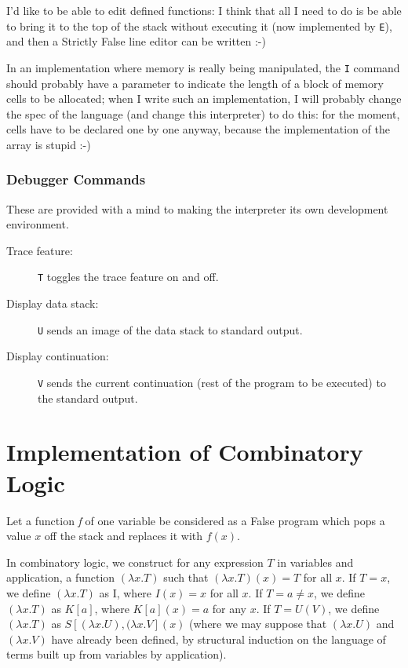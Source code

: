 \documentclass[12pt]{article}
\begin{document}
I'd like to be able to edit defined functions: I think that all I need
to do is be able to bring it to the top of the stack without executing
it (now implemented by {\tt E}), and then a Strictly False line editor
can be written :-)

In an implementation where memory is really being manipulated, the {\tt I}
command should probably have a parameter to indicate the length of
a block of memory cells to be allocated; when I write such an implementation,
I will probably change the spec of the language (and change this
interpreter) to do this:  for the moment, cells have to be declared one
by one anyway, because the implementation of the array is stupid :-)

\subsubsection{Debugger Commands}

These are provided with a mind to making the interpreter its
own development environment.
\begin{description}
\item[Trace feature:]  {\tt T} toggles the trace feature on and off.

\item[Display data stack:]  
{\tt U} sends an image of the data stack to standard output.

\item[Display continuation:]  {\tt V} sends the current continuation
(rest of the program to be executed) to the standard output.
\end{description}

\section{Implementation of Combinatory Logic}

Let a function {\em f} of one variable be considered as a False
program which pops a value $x$ off the stack and replaces it with
$f(x)$.

In combinatory logic, we construct for any expression $T$ in variables
and application, a function $(\lambda x.T)$ such that $(\lambda
x.T)(x) = T$ for all $x$.  If $T=x$, we define $(\lambda x.T)$ as I,
where $I(x) = x$ for all $x$.  If $T=a\neq x$, we define $(\lambda
x.T)$ as $K[a]$, where $K[a](x)=a$ for any $x$.  If $T=U(V)$, we
define $(\lambda x.T)$ as $S[(\lambda x.U),(\lambda x.V](x)$ (where we
may suppose that $(\lambda x.U)$ and $(\lambda x.V)$ have already been
defined, by structural induction on the language of terms built up
from variables by application).
\end{document}
